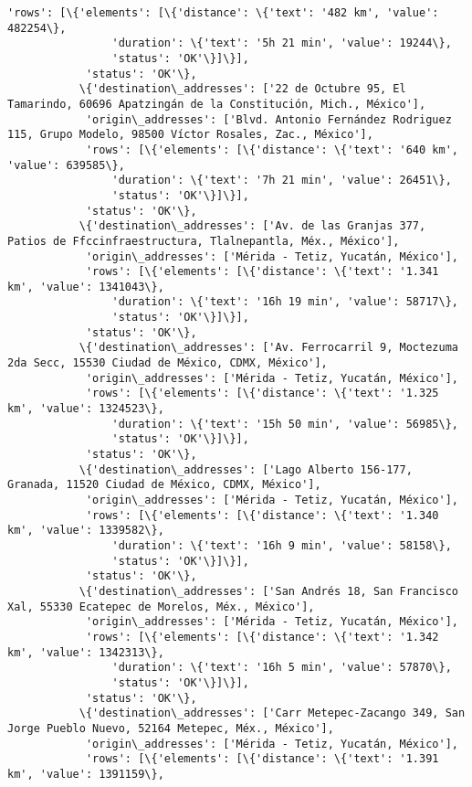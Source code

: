 \documentclass[11pt]{article}
\begin{document}
\begin{Verbatim}[commandchars=\\\{\}]
            'rows': [\{'elements': [\{'distance': \{'text': '482 km', 'value': 482254\},
                'duration': \{'text': '5h 21 min', 'value': 19244\},
                'status': 'OK'\}]\}],
            'status': 'OK'\},
           \{'destination\_addresses': ['22 de Octubre 95, El Tamarindo, 60696 Apatzingán de la Constitución, Mich., México'],
            'origin\_addresses': ['Blvd. Antonio Fernández Rodriguez 115, Grupo Modelo, 98500 Víctor Rosales, Zac., México'],
            'rows': [\{'elements': [\{'distance': \{'text': '640 km', 'value': 639585\},
                'duration': \{'text': '7h 21 min', 'value': 26451\},
                'status': 'OK'\}]\}],
            'status': 'OK'\},
           \{'destination\_addresses': ['Av. de las Granjas 377, Patios de Ffccinfraestructura, Tlalnepantla, Méx., México'],
            'origin\_addresses': ['Mérida - Tetiz, Yucatán, México'],
            'rows': [\{'elements': [\{'distance': \{'text': '1.341 km', 'value': 1341043\},
                'duration': \{'text': '16h 19 min', 'value': 58717\},
                'status': 'OK'\}]\}],
            'status': 'OK'\},
           \{'destination\_addresses': ['Av. Ferrocarril 9, Moctezuma 2da Secc, 15530 Ciudad de México, CDMX, México'],
            'origin\_addresses': ['Mérida - Tetiz, Yucatán, México'],
            'rows': [\{'elements': [\{'distance': \{'text': '1.325 km', 'value': 1324523\},
                'duration': \{'text': '15h 50 min', 'value': 56985\},
                'status': 'OK'\}]\}],
            'status': 'OK'\},
           \{'destination\_addresses': ['Lago Alberto 156-177, Granada, 11520 Ciudad de México, CDMX, México'],
            'origin\_addresses': ['Mérida - Tetiz, Yucatán, México'],
            'rows': [\{'elements': [\{'distance': \{'text': '1.340 km', 'value': 1339582\},
                'duration': \{'text': '16h 9 min', 'value': 58158\},
                'status': 'OK'\}]\}],
            'status': 'OK'\},
           \{'destination\_addresses': ['San Andrés 18, San Francisco Xal, 55330 Ecatepec de Morelos, Méx., México'],
            'origin\_addresses': ['Mérida - Tetiz, Yucatán, México'],
            'rows': [\{'elements': [\{'distance': \{'text': '1.342 km', 'value': 1342313\},
                'duration': \{'text': '16h 5 min', 'value': 57870\},
                'status': 'OK'\}]\}],
            'status': 'OK'\},
           \{'destination\_addresses': ['Carr Metepec-Zacango 349, San Jorge Pueblo Nuevo, 52164 Metepec, Méx., México'],
            'origin\_addresses': ['Mérida - Tetiz, Yucatán, México'],
            'rows': [\{'elements': [\{'distance': \{'text': '1.391 km', 'value': 1391159\},

\end{Verbatim}
\end{document}
